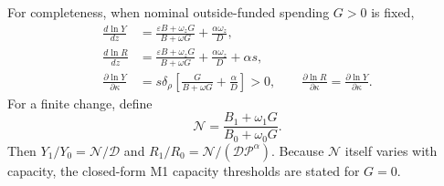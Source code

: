 For completeness, when nominal outside-funded spending \(G>0\) is fixed,
\begin{align}
 \frac{d\ln Y}{dz}
 &=\frac{\varepsilon B+\omega_zG}{B+\omega G}
 +\frac{\alpha\omega_z}{D}, \\
 \frac{d\ln R}{dz}
 &=\frac{\varepsilon B+\omega_zG}{B+\omega G}
 +\frac{\alpha\omega_z}{D}+\alpha s, \\
 \frac{\partial\ln Y}{\partial\kappa}
 &=s\delta_\rho\left[\frac{G}{B+\omega G}+\frac{\alpha}{D}\right]>0,
 \qquad
 \frac{\partial\ln R}{\partial\kappa}
 =\frac{\partial\ln Y}{\partial\kappa}.
 \label{eq:g-positive-derivatives}
\end{align}
For a finite change, define
\[
 \mathcal N=\frac{B_1+\omega_1G}{B_0+\omega_0G}.
\]
Then \(Y_1/Y_0=\mathcal N/\mathcal D\) and
\(R_1/R_0=\mathcal N/(\mathcal D\mathcal P^\alpha)\). Because
\(\mathcal N\) itself varies with capacity, the closed-form M1 capacity
thresholds are stated for \(G=0\).

